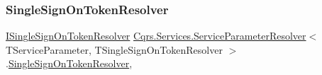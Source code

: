 \subsubsection{\texorpdfstring{Single\+Sign\+On\+Token\+Resolver}{SingleSignOnTokenResolver}}
{\footnotesize\ttfamily \hyperlink{interfaceCqrs_1_1Services_1_1ISingleSignOnTokenResolver}{I\+Single\+Sign\+On\+Token\+Resolver} \hyperlink{classCqrs_1_1Services_1_1ServiceParameterResolver}{Cqrs.\+Services.\+Service\+Parameter\+Resolver}$<$ T\+Service\+Parameter, T\+Single\+Sign\+On\+Token\+Resolver $>$.\hyperlink{classCqrs_1_1Authentication_1_1SingleSignOnTokenResolver}{Single\+Sign\+On\+Token\+Resolver}\hspace{0.3cm}{\ttfamily [get]}, {\ttfamily [protected]}}

